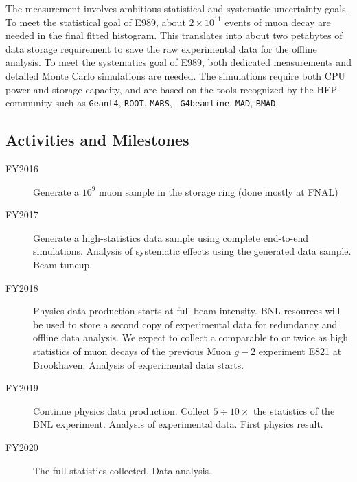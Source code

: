 \documentclass[pdftex,12pt,letter]{article}
\begin{document}
The measurement involves ambitious statistical and systematic
uncertainty goals. 
To meet the statistical goal of E989, about $2\times 10^{11}$ events
of muon decay are needed in the final fitted histogram. 
This translates into about two petabytes of data storage requirement
to save the raw experimental data for the offline analysis. 
To meet the systematics goal of E989, both dedicated measurements and
detailed Monte Carlo simulations are needed. 
The simulations require both CPU power and storage capacity,
and are based on the tools recognized by
the HEP community such as {\tt Geant4}, {\tt ROOT}, {\tt MARS}, {\tt
  G4beamline}, {\tt MAD}, {\tt BMAD}. 

\subsection{Activities and Milestones}

\begin{description}
\item[FY2016] 
Generate a $10^9$ muon sample in the storage ring (done mostly at FNAL)
\item[FY2017] 
  Generate a high-statistics data sample using complete end-to-end simulations. 
  Analysis of systematic effects using the generated data sample. 
  Beam tuneup. 
\item[FY2018] 
  Physics data production starts at full beam intensity. 
  BNL resources will be used to store a second copy of experimental data for redundancy and offline data analysis. 
  We expect to collect a comparable to or twice as high statistics of muon decays of the previous Muon $g-2$ experiment E821 at Brookhaven. 
  Analysis of experimental data starts. 
\item[FY2019] 
  Continue physics data production. 
  Collect $5\div 10\times$ the statistics of the BNL experiment. 
  Analysis of experimental data.  
  First physics result. 
\item[FY2020]
  The full statistics collected. Data analysis.  
\end{description}
\end{document}
